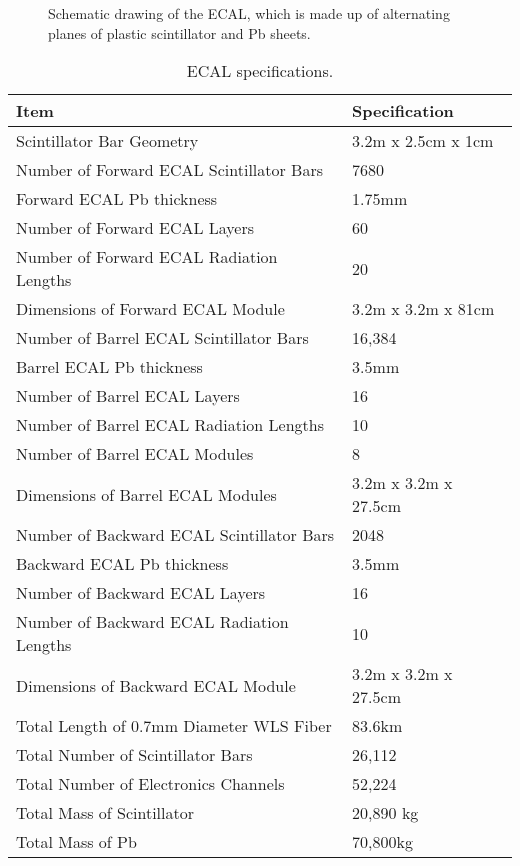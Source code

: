 \begin{figure}
\begin{center}
\caption[Schematic drawing of the ECAL]{\label{ECAL_detail} Schematic drawing of the ECAL, which is made up of alternating planes
of plastic scintillator and Pb sheets.}
\end{center}
\end{figure}

\begin{table}
\centering
  \caption{\label{ECAL_specs} ECAL specifications.}
  \begin{tabular}{| l | l |}
    \hline
Item&Specification \\
    \hline
Scintillator Bar Geometry & 3.2m x 2.5cm x 1cm \\
Number of Forward ECAL Scintillator Bars & 7680 \\
Forward ECAL Pb thickness & 1.75mm \\
Number of Forward ECAL Layers & 60 \\
Number of Forward ECAL Radiation Lengths & 20 \\
Dimensions of Forward ECAL Module & 3.2m x 3.2m x 81cm \\
Number of Barrel ECAL Scintillator Bars & 16,384 \\
Barrel ECAL Pb thickness & 3.5mm \\
Number of Barrel ECAL Layers & 16 \\
Number of Barrel ECAL Radiation Lengths & 10 \\
Number of Barrel ECAL Modules & 8 \\
Dimensions of Barrel ECAL Modules & 3.2m x 3.2m x 27.5cm \\
Number of Backward ECAL Scintillator Bars & 2048 \\
Backward ECAL Pb thickness & 3.5mm \\
Number of Backward ECAL Layers & 16 \\
Number of Backward ECAL Radiation Lengths & 10 \\
Dimensions of Backward ECAL Module & 3.2m x 3.2m x 27.5cm \\
Total Length of 0.7mm Diameter WLS Fiber & 83.6km \\
Total Number of Scintillator Bars & 26,112 \\
Total Number of Electronics Channels & 52,224 \\
Total Mass of Scintillator & 20,890 kg \\
Total Mass of Pb & 70,800kg \\
     \hline
  \end{tabular}
\end{table}


